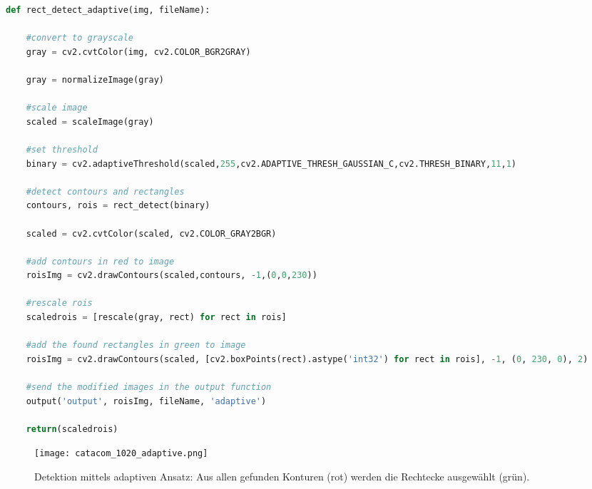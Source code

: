 \begin{lstlisting}[language=Python]
def rect_detect_adaptive(img, fileName):
        
    #convert to grayscale
    gray = cv2.cvtColor(img, cv2.COLOR_BGR2GRAY)
        
    gray = normalizeImage(gray)
        
    #scale image
    scaled = scaleImage(gray)
    
    #set threshold
    binary = cv2.adaptiveThreshold(scaled,255,cv2.ADAPTIVE_THRESH_GAUSSIAN_C,cv2.THRESH_BINARY,11,1)       
        
    #detect contours and rectangles
    contours, rois = rect_detect(binary) 
       
    scaled = cv2.cvtColor(scaled, cv2.COLOR_GRAY2BGR)
        
    #add contours in red to image
    roisImg = cv2.drawContours(scaled,contours, -1,(0,0,230))
        
    #rescale rois
    scaledrois = [rescale(gray, rect) for rect in rois]
        
    #add the found rectangles in green to image
    roisImg = cv2.drawContours(scaled, [cv2.boxPoints(rect).astype('int32') for rect in rois], -1, (0, 230, 0), 2)
        
    #send the modified images in the output function
    output('output', roisImg, fileName, 'adaptive')

    return(scaledrois)
\end{lstlisting}

\begin{SCfigure}[0.5][h!]
\caption{Detektion mittels adaptiven Ansatz: Aus allen gefunden Konturen (rot) werden die Rechtecke ausgewählt (grün).}
\texttt{[image: catacom\_1020\_adaptive.png]}
\end{SCfigure}

